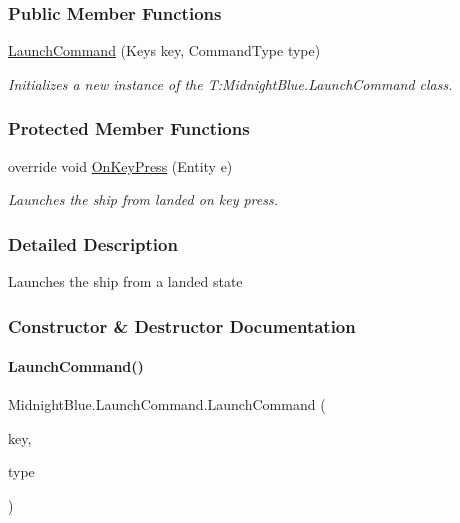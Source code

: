 \subsubsection*{Public Member Functions}
\begin{DoxyCompactItemize}
\item 
\hyperlink{class_midnight_blue_1_1_launch_command_af557e1d21514b76f8adb28fd5c43d279}{Launch\+Command} (Keys key, Command\+Type type)
\begin{DoxyCompactList}\small\item\em Initializes a new instance of the T\+:\+Midnight\+Blue.\+Launch\+Command class. \end{DoxyCompactList}\end{DoxyCompactItemize}
\subsubsection*{Protected Member Functions}
\begin{DoxyCompactItemize}
\item 
override void \hyperlink{class_midnight_blue_1_1_launch_command_a5da2fdd898111ea59f4f63126c380a3e}{On\+Key\+Press} (Entity e)
\begin{DoxyCompactList}\small\item\em Launches the ship from landed on key press. \end{DoxyCompactList}\end{DoxyCompactItemize}


\subsubsection{Detailed Description}
Launches the ship from a landed state 



\subsubsection{Constructor \& Destructor Documentation}
\hypertarget{class_midnight_blue_1_1_launch_command_af557e1d21514b76f8adb28fd5c43d279}{}\label{class_midnight_blue_1_1_launch_command_af557e1d21514b76f8adb28fd5c43d279} 
\paragraph{\texorpdfstring{Launch\+Command()}{LaunchCommand()}}
{\footnotesize\ttfamily Midnight\+Blue.\+Launch\+Command.\+Launch\+Command (\begin{DoxyParamCaption}\item[{Keys}]{key,  }\item[{Command\+Type}]{type }\end{DoxyParamCaption})\hspace{0.3cm}{\ttfamily [inline]}}




